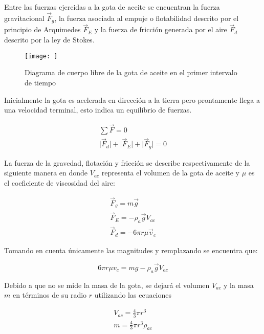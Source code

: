 \documentclass[journal, table]{IEEEtran}
\begin{document}
Entre las fuerzas ejercidas a la gota de aceite se encuentran la fuerza gravitacional $\Vec{F}_g$, la fuerza asociada al empuje o flotabilidad descrito por el principio de Arquimedes $\Vec{F}_E$ y la fuerza de fricción generada por el aire $\Vec{F}_d$ descrito por la ley de Stokes.\\

\begin{figure}
    \centering
    \texttt{[image: ]}
    \caption{Diagrama de cuerpo libre de la gota de aceite en el primer intervalo de tiempo}
    \label{fig:enter-label}
\end{figure}

Inicialmente la gota es acelerada en dirección a la tierra pero prontamente llega a una velocidad terminal, esto indica un equilibrio de fuerzas.

\begin{equation}
    \begin{split}
        \sum \Vec{F}=0\\
        \lvert \Vec{F}_d\rvert + \lvert\Vec{F}_E\rvert + \lvert \Vec{F}_g\rvert =0
    \end{split}
\end{equation}

La fuerza de la gravedad, flotación y fricción se describe respectivamente de la siguiente manera en donde $V_{ac}$ representa el volumen de la gota de aceite y $\mu$ es el coeficiente de viscosidad del aire:

\begin{equation}
    \begin{split}
        \Vec{F}_g=m\Vec{g}\\
        \Vec{F}_E=-\rho_a \Vec{g}V_{ac}\\
        \Vec{F}_d=-6\pi r\mu \Vec{v}_c
    \end{split}
\end{equation}

Tomando en cuenta únicamente las magnitudes y remplazando se encuentra que:

\begin{equation}
    6\pi r\mu v_c=mg-\rho_a \Vec{g}V_{ac}
\end{equation}

Debido a que no se mide la masa de la gota, se dejará el volumen $V_{ac}$ y la masa $m$ en términos de su radio $r$ utilizando las ecuaciones

\begin{equation}
    \begin{split}
        V_{ac}=\frac{4}{3}\pi r^3\\
        m=\frac{4}{3}\pi r^3\rho_{ac}
    \end{split}
\end{equation}
\end{document}
